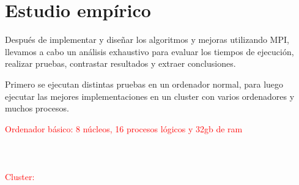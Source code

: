 


\chapter{Estudio empírico}

Después de implementar y diseñar los algoritmos y mejoras utilizando MPI, llevamos a  cabo un análisis exhaustivo para evaluar los tiempos de ejecución, realizar pruebas, contrastar resultados y extraer conclusiones.

Primero se ejecutan distintas pruebas en un ordenador normal, para luego ejecutar las mejores implementaciones en un cluster con varios ordenadores y muchos procesos.



\begin{tcolorbox}[boxrule=0.5pt, fontupper=\small]
\scriptsize
\textcolor{red}{
Ordenador básico: 8 núcleos, 16 procesos lógicos y 32gb de ram\\
\\
\\
\\
Cluster:
\\
}
\end{tcolorbox}
	





